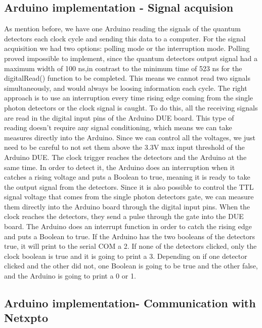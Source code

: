\begin{refsection}
		\subsection{Arduino implementation - Signal acquision}
		As mention before, we have one Arduino reading the signals of the quantum detectors each clock cycle and sending this data to a computer. For the signal acquisition we had two options: polling mode or the interruption mode. Polling proved impossible to implement, since the quantum detectors output signal had a maximum width of 100 ns,in contrast to the minimum time of 523 ns for the digitalRead() function to be completed. This means we cannot read two signals simultaneously, and would always be loosing information each cycle. The right approach is to use an interruption every time rising edge coming from the single photon detectors or the clock signal is caught. To do this, all the receiving signals are read in the digital input pins of the Arduino DUE board. This type of reading doesn't require any signal conditioning, which means we can take measures directly into the Arduino. Since we can control all the voltages, we just need to be careful to not set them above the 3.3V max input threshold of the Arduino DUE. The clock trigger reaches the detectors and the Arduino at the same time. In order to detect it, the Arduino does an interruption when it catches a rising voltage and puts a Boolean to true, meaning it is ready to take the output signal from the detectors.
		Since it is also possible to control the TTL signal voltage that comes from the single photon detectors gate, we can measure them directly into the Arduino board through the digital input pins. When the clock reaches the detectors, they send a pulse through the gate into the DUE board. The Arduino does an interrupt function in order to catch the rising edge and puts a Boolean to true. If the Arduino has the two booleans
		of the detectors true, it will print to the serial COM a 2. If none of the detectors clicked, only the clock boolean is true and it is going to print a 3. Depending on if one detector clicked and the other did not, one Boolean is going to be true and the other false, and the Arduino is going to print a 0 or 1.
		
		\subsection{Arduino implementation- Communication with Netxpto}
		

\end{refsection}
